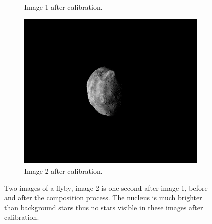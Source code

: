 \begin{figure}[htb]
\begin{subfigure}[b]{0.48\textwidth}
                \caption{Image 1 after calibration.}
                \label{fig:composition_after_1}
        \end{subfigure}
        \begin{subfigure}[b]{0.48\textwidth}
            \centering
                \includegraphics[width=\textwidth]{doc/thesis/0_figures/rendering_lighting/Inst_2017-08-15T115859-288000.png}
                \caption{Image 2 after calibration.}
                \label{fig:composition_after_2}
        \end{subfigure}
        \caption{Two images of a flyby, image 2 is one second after image 1, before and after the composition process. The nucleus is much brighter than background stars thus no stars visible in these images after calibration.}
        \label{fig:composition_before_after}
\end{figure}


